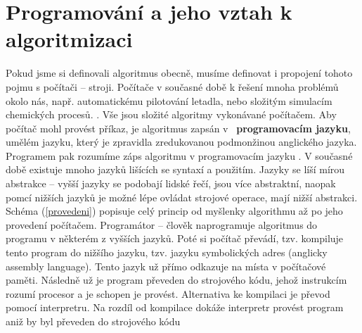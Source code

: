 \documentclass[FP,DP]{tulthesis}
\begin{document}
\section{Programování a jeho vztah k algoritmizaci}
Pokud jsme si definovali algoritmus obecně, musíme definovat i propojení tohoto pojmu s počítači -- stroji. Počítače v současné době k řešení mnoha problémů okolo nás, např. automatickému pilotování letadla, nebo složitým simulacím chemických procesů.  \citep[s.~49]{spirit}. Vše jsou složité algoritmy vykonávané počítačem. Aby počítač mohl provést příkaz, je algoritmus zapsán v~\textbf{ programovacím jazyku}, umělém jazyku, který je zpravidla zredukovanou podmonžinou anglického jazyka. Programem pak rozumíme záps algoritmu v programovacím jazyku \citep[s.~6]{motycka}. V současné době existuje mnoho jazyků lišících se syntaxí a použitím. Jazyky se líší mírou abstrakce -- vyšší jazyky se podobají lidské řečí, jsou více abstraktní, naopak pomcí nižších jazyků je možné lépe ovládat strojové operace, mají nižší abstrakci.  Schéma (\ref{provedeni}) popisuje celý princip od myšlenky algorithmu až po jeho provedení počítačem. Programátor -- člověk naprogramuje algoritmus do programu  v některém z vyšších jazyků. Poté si počítač převádí, tzv. kompiluje tento program do nižšího jazyku, tzv. jazyku symbolických adres (anglicky assembly language). Tento jazyk už přímo odkazuje na místa v počítačové paměti. Následně už je program převeden do strojového kódu, jehož instrukcím rozumí procesor a je schopen je provést. Alternativa ke kompilaci je převod pomocí interpretru. Na rozdíl od kompilace dokáže interpretr provést program aniž by byl převeden do strojového kódu \citep[s.~54-57]{spirit}
\end{document}
